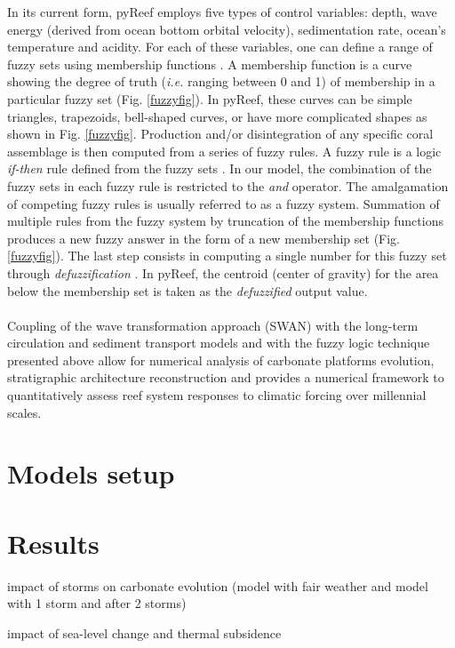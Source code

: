 \documentclass[default,jgrga]{agutex2015}
\begin{document}
\begin{article}
In its current form, pyReef employs five types of control variables: depth, wave energy (derived from ocean bottom orbital velocity), sedimentation rate, ocean's temperature and acidity. For each of these variables, one can define a range of fuzzy sets using membership functions \citep{Nordlund99}. A membership function is a curve showing the degree of truth (\textit{i.e.} ranging between 0 and 1) of membership in a particular fuzzy set (Fig. \ref{fuzzyfig}). In pyReef, these curves can be simple triangles, trapezoids, bell-shaped curves, or have more complicated shapes as shown in Fig. \ref{fuzzyfig}. Production and/or disintegration of any specific coral assemblage is then computed from a series of fuzzy rules. A fuzzy rule is a logic \textit{if-then} rule defined from the fuzzy sets \citep{Demicco01}. In our model, the combination of the fuzzy sets in each fuzzy rule is restricted to the \textit{and} operator. The amalgamation of competing fuzzy rules is usually referred to as a fuzzy system. Summation of multiple rules from the fuzzy system by truncation of the membership functions produces a new fuzzy answer in the form of a new membership set (Fig. \ref{fuzzyfig}). The last step consists in computing a single number for this fuzzy set through \textit{defuzzification} \citep{Zadeh65}. In pyReef, the centroid (center of gravity) for the area below the membership set is taken as the \textit{defuzzified} output value.
\\
\\
Coupling of the wave transformation approach (SWAN) with the long-term circulation and sediment transport models and with the fuzzy logic technique presented above allow for numerical analysis of carbonate platforms evolution, stratigraphic architecture reconstruction and provides a numerical framework to quantitatively assess reef system responses to climatic forcing over millennial scales.

\section{Models setup}


\section{Results}

impact of storms on carbonate evolution (model with fair weather and model with 1 storm and after 2 storms)

impact of sea-level change and thermal subsidence


\end{article}
\end{document}
